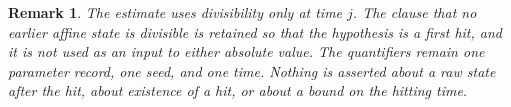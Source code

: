 \documentclass[11pt,letterpaper]{article}
\newtheorem{remark}[theorem]{Remark}
\begin{document}
\begin{remark}
The estimate uses divisibility only at time \(j\). The clause that no earlier
affine state is divisible is retained so that the hypothesis is a first hit,
and it is not used as an input to either absolute value. The quantifiers remain
one parameter record, one seed, and one time. Nothing is asserted about a raw
state after the hit, about existence of a hit, or about a bound on the hitting
time.
\end{remark}
\end{document}
